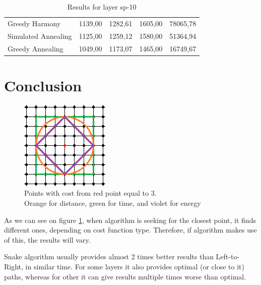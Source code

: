 \documentclass[titlepage]{article}
\begin{document}
\begin{table}[H]
\begin{center}
\begin{tabular}{|m{4cm}||r|r|r|r|}
			\\ \cline{2-5}
			
			Greedy Harmony & 1139,00	& 1282,61	& 1605,00& 	78065,78
			
			\\ \cline{2-5}
			
			Simulated Annealing & 1125,00	& 1259,12	& 1580,00	& 51364,94
			
			\\ \cline{2-5}
			
			Greedy Annealing & \cellcolor{yellow!50}1049,00	& 1173,07& 	\cellcolor{yellow!50}1465,00	& 16749,67
			
			\\ \hline
			
		\end{tabular}
		\caption{Results for layer sp-10}
		\label{tab:results-sp-10}
	\end{center}
\end{table}

\section{Conclusion}
\begin{figure}
\begin{center}
\includegraphics[scale=2]{img/costs}
\end{center}
\caption{Points with cost from red point equal to 3.\\Orange for distance, green for time, and violet for energy}
\label{cost_function_representation}
\end{figure}
As we can see on figure \ref{cost_function_representation}, when algorithm is seeking for the closest point, it finds different ones, depending on cost function type. Therefore, if algorithm makes use of this, the results will vary.

Snake algorithm usually provides almost 2 times better results than Left-to-Right, in similar time. For some layers it also provides optimal (or close to it) paths, whereas for other it can give results multiple times worse than optimal.
\end{document}
